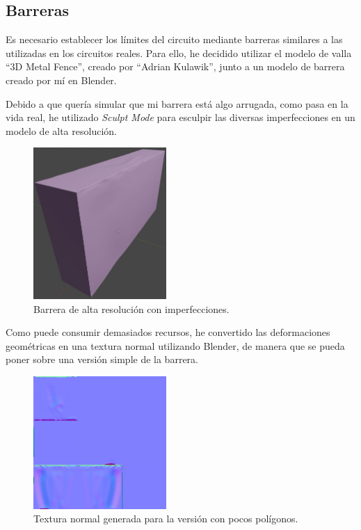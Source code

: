 \newpage

\subsection{Barreras}

Es necesario establecer los límites del circuito mediante barreras similares a las utilizadas en los circuitos reales. Para ello, he decidido utilizar el modelo de valla ``3D Metal Fence''\cite{fence}, creado por ``Adrian Kulawik'', junto a un modelo de barrera creado por mí en Blender.

\bigskip

Debido a que quería simular que mi barrera está algo arrugada, como pasa en la vida real, he utilizado \textit{Sculpt Mode} para esculpir las diversas imperfecciones en un modelo de alta resolución. 

\begin{figure}[H]
    \centering
    \includegraphics[width=0.45\textwidth]{imagenes/converted/barrier/barrierHP.jpg}
    \caption{Barrera de alta resolución con imperfecciones.}
    \label{fig:barreraHP}
\end{figure}

Como puede consumir demasiados recursos, he convertido las deformaciones geométricas en una textura normal utilizando Blender, de manera que se pueda poner sobre una versión simple de la barrera.

\begin{figure}[H]
    \centering
    \includegraphics[width=0.45\textwidth]{imagenes/converted/barrier/barrierNormal.jpg}
    \caption{Textura normal generada para la versión con pocos polígonos.}
    \label{fig:barreraLP}
\end{figure}


